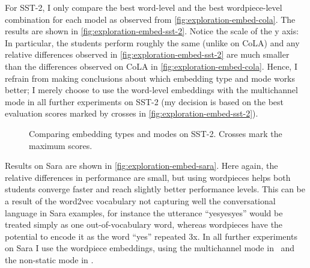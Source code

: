 {{    For SST-2, I only compare the best word-level and the best wordpiece-level combination for each model as observed from \autoref{fig:exploration-embed-cola}. The results are shown in \autoref{fig:exploration-embed-sst-2}. Notice the scale of the y axis: In particular, the students perform roughly the same (unlike on CoLA) and any relative differences observed in \autoref{fig:exploration-embed-sst-2} are much smaller than the differences observed on CoLA in \autoref{fig:exploration-embed-cola}. Hence, I refrain from making conclusions about which embedding type and mode works better; I merely choose to use the word-level embeddings with the multichannel mode in all further experiments on SST-2 (my decision is based on the best evaluation scores marked by crosses in \autoref{fig:exploration-embed-sst-2}).

    \begin{figure}[h!t]
      \centering
      \caption{Comparing embedding types and modes on SST-2. Crosses mark the maximum scores. \sliding}
      \label{fig:exploration-embed-sst-2}
    \end{figure}

    Results on Sara are shown in \autoref{fig:exploration-embed-sara}. Here again, the relative differences in performance are small, but using wordpieces helps both students converge faster and reach slightly better performance levels. This can be a result of the word2vec vocabulary not capturing well the conversational language in Sara examples, for instance the utterance ``yesyesyes'' would be treated simply as one out-of-vocabulary word, whereas wordpieces have the potential to encode it as the word ``yes'' repeated 3x. In all further experiments on Sara I use the wordpiece embeddings, using the multichannel mode in \LSTMS~and the non-static mode in \BERTS.

}}
